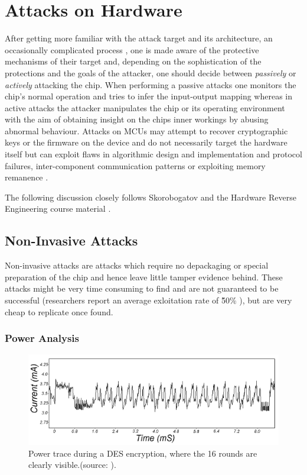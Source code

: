 \section{Attacks on Hardware}
\label{sec:curr_attacks}

After getting more familiar with the attack target and its architecture, an occasionally complicated process \citep{sergei:thesis} \citep{hwre},  one is made aware of the protective mechanisms of their target and, depending on the sophistication of the protections and the goals of the attacker, one should decide between \emph{passively} or \emph{actively} attacking the chip. When performing a passive attacks one monitors the chip's normal operation and tries to infer the input-output mapping whereas in active attacks the attacker manipulates the chip or its operating environment with the aim of obtaining insight on the chips inner workings by abusing abnormal behaviour. Attacks on MCUs may attempt to recover cryptographic keys or the firmware on the device and do not necessarily target the hardware itself but can exploit flaws in algorithmic design and implementation and protocol failures, inter-component communication patterns \citep{anderson:cautionary_note} \citep{kocher:DPA} or exploiting memory remanence \citep{sergei:thesis} \citep{gutman:memory_remanence}.

The following discussion closely follows Skorobogatov \citep{sergei:thesis} and the Hardware Reverse Engineering course material \citep{hwre}.

	\subsection{Non-Invasive Attacks}
	Non-invasive attacks are attacks which require no depackaging or special preparation of the chip and hence leave little tamper evidence behind. These attacks might be very time consuming to find and are not guaranteed to be successful (researchers report an average exloitation rate of \~50\% \citep{sergei:thesis} \citep{glitches_paper}), but are very cheap to replicate once found.
	
	\subsubsection{Power Analysis}	
	\label{subsubsec:power_analysis}

	\begin{figure}
		\center
		\includegraphics[scale=0.7]{img/power_des.png}
		\caption{\footnotesize Power trace during a DES encryption, where the 16 rounds are clearly visible.(source: \protect\citep{kocher:DPA}).}
		\label{fig:des_power}		
	\end{figure}

